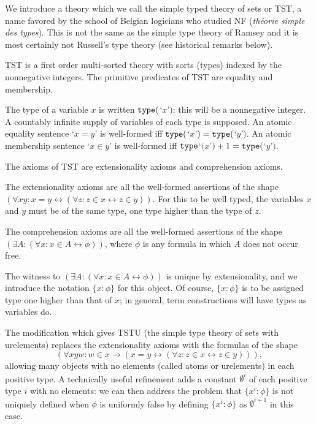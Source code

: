 \documentclass[112pt]{article}
\begin{document}
We introduce a theory which we call the simple typed theory of sets or TST, a name favored by the school of Belgian logicians who studied NF ({\em th\'eorie simple des types}).  This is not the same as the simple type theory of Ramsey and it is most certainly not Russell's type theory  (see historical remarks below).

TST is a first order multi-sorted theory with sorts (types) indexed by the nonnegative integers.  The primitive predicates of TST are equality and membership.

The type of a variable $x$ is written ${\tt type}($`$x$'$)$:  this will be a nonnegative integer.   A countably infinite supply of variables of each type is supposed.  An atomic equality sentence `$x=y$' is well-formed iff ${\tt type}($`$x$'$)={\tt type}($`$y$'$)$.
An atomic membership sentence `$x \in y$' is well-formed iff ${\tt type}$`$(x$'$)+1 = {\tt type}($`$y$'$)$.

The axioms of TST are extensionality axioms and comprehension axioms.

The extensionality axioms are all the well-formed assertions of the shape $(\forall xy:x=y \leftrightarrow (\forall z:z \in x \leftrightarrow z\in y))$.  For this to be well typed, the variables
$x$ and $y$ must be of the same type, one type higher than the type of $z$.

The comprehension axioms are all the well-formed assertions of the shape $(\exists A:(\forall x:x \in A \leftrightarrow \phi))$, where $\phi$ is any formula in which $A$ does not occur free.

The witness to $(\exists A:(\forall x:x \in A \leftrightarrow \phi))$ is unique by extensionality, and we introduce the notation $\{x:\phi\}$ for this object.  Of course, $\{x:\phi\}$  is to be assigned type one higher than that of $x$;  in general, term constructions will have types as variables do.

The modification which gives TSTU (the simple type theory of sets with urelements) replaces the extensionality axioms with the formulas of the shape $$(\forall xyw:w \in x \rightarrow (x=y \leftrightarrow (\forall z:z \in x \leftrightarrow z\in y))),$$  allowing many objects with no elements (called atoms or urelements)  in each positive type.  A technically useful refinement adds a constant $\emptyset^i$ of each positive type $i$ with no elements:  we can then address the problem that $\{x^i:\phi\}$ is not uniquely defined when $\phi$ is uniformly false by defining $\{x^i:\phi\}$ as $\emptyset^{i+1}$ in this case.
\end{document}
